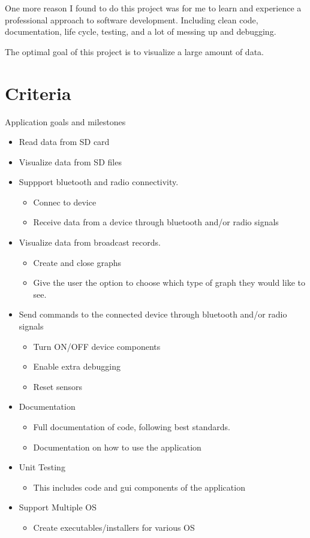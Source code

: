 One more reason I found to do this project was for me to learn and experience a professional approach to software development. Including clean code, documentation, life cycle, testing, and a lot of messing up and debugging. 

The optimal goal of this project is to visualize a large amount of data.

\section{Criteria}
Application goals and milestones
\begin{itemize}
	\item Read data from SD card
	\item Visualize data from SD files
	\item Suppport bluetooth and radio connectivity.
		\begin{itemize}
		\item Connec to device
		\item Receive data from a device through bluetooth and/or radio signals
		\end{itemize}
	\item Visualize data from broadcast records.
		\begin{itemize}
		\item Create and close graphs
		\item Give the user the option to choose which type of graph they would like to see.
		\end{itemize}	
	\item Send commands to the connected device through bluetooth and/or radio signals
		\begin{itemize}
		\item Turn ON/OFF device components
		\item Enable extra debugging
		\item Reset sensors
		\end{itemize}
	\item Documentation
		\begin{itemize}
		\item Full documentation of code, following best standards.
		\item Documentation on how to use the application
		\end{itemize}
	\item Unit Testing
		\begin{itemize}
		\item This includes code and gui components of the application
		\end{itemize}
	\item Support Multiple OS
		\begin{itemize}
		\item Create executables/installers for various OS
		\end{itemize}
\end{itemize}
